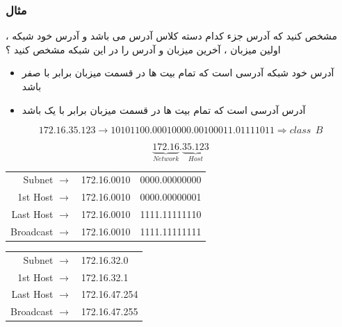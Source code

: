 \documentclass[12pt]{book}
\begin{document}
\newpage

\subsubsection{مثال}


 مشخص کنید که آدرس 
جزء کدام دسته کلاس آدرس می باشد و آدرس خود شبکه ، اولین میزبان ، آخرین میزبان و آدرس
 را در این شبکه مشخص کنید ؟


\begin{itemize}
	\item آدرس خود شبکه آدرسی است که تمام بیت ها در قسمت میزبان برابر با صفر باشد
	\item آدرس 
آدرسی است که تمام بیت ها در قسمت میزبان برابر با یک باشد
\end{itemize}




\begin{tcolorbox}
$$
172.16.35.123 \to 10101100.00010000.00100011.01111011 \Rightarrow class \:\: B
$$


$$
\underbrace{172.16}_{Network}.\underbrace{35.123}_{Host}
$$


\begin{latin}
\begin{center}
  \begin{tabular}{ r  r | l  }
    Subnet $\to$ & 172.16.0010 & 0000.00000000 \\
    1st Host $\to$ & 172.16.0010 & 0000.00000001 \\
    Last Host $\to$ & 172.16.0010 & 1111.11111110 \\
    Broadcast $\to$ & 172.16.0010 & 1111.11111111 \\
  \end{tabular}
\end{center}
\end{latin}


\begin{latin}
\begin{center}
  \begin{tabular}{ r  l   }
    Subnet $\to$ & 172.16.32.0  \\
    1st Host $\to$ & 172.16.32.1  \\
    Last Host $\to$ & 172.16.47.254 \\
    Broadcast $\to$ & 172.16.47.255 \\
  \end{tabular}
\end{center}
\end{latin}

\end{tcolorbox}
\end{document}
